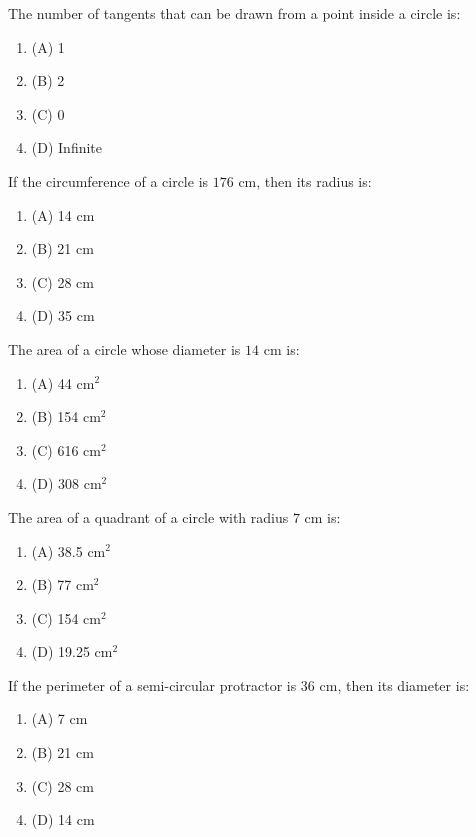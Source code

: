 \documentclass[12pt,a4paper]{exam}
\begin{document}
\begin{questions}
\question[1] The number of tangents that can be drawn from a point inside a circle is:
\begin{enumerate}[label=(\Alph*)]
  \item (A) 1
  \item (B) 2
  \item (C) 0
  \item (D) Infinite
\end{enumerate}
\vspace{0.15cm}

\question[1] If the circumference of a circle is $176\text{ cm}$, then its radius is:
\begin{enumerate}[label=(\Alph*)]
  \item (A) 14 cm
  \item (B) 21 cm
  \item (C) 28 cm
  \item (D) 35 cm
\end{enumerate}
\vspace{0.15cm}

\question[1] The area of a circle whose diameter is $14\text{ cm}$ is:
\begin{enumerate}[label=(\Alph*)]
  \item (A) 44 cm$^{2}$
  \item (B) 154 cm$^{2}$
  \item (C) 616 cm$^{2}$
  \item (D) 308 cm$^{2}$
\end{enumerate}
\vspace{0.15cm}

\question[1] The area of a quadrant of a circle with radius $7\text{ cm}$ is:
\begin{enumerate}[label=(\Alph*)]
  \item (A) 38.5 cm$^{2}$
  \item (B) 77 cm$^{2}$
  \item (C) 154 cm$^{2}$
  \item (D) 19.25 cm$^{2}$
\end{enumerate}
\vspace{0.15cm}

\question[1] If the perimeter of a semi-circular protractor is $36\text{ cm}$, then its diameter is:
\begin{enumerate}[label=(\Alph*)]
  \item (A) 7 cm
  \item (B) 21 cm
  \item (C) 28 cm
  \item (D) 14 cm
\end{enumerate}
\vspace{0.15cm}


\end{questions}
\end{document}

